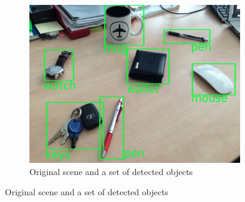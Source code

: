 \documentclass[conference]{IEEEtran}
\begin{document}
	
	\begin{figure}[th!]
		\center
		\begin{subfigure}{1.0\columnwidth}
			\center
			\includegraphics[width=0.6\columnwidth]{img/map_original.jpg}
			\caption{Original scene and a set of detected objects}
			\label{fig:object-detection}
		\end{subfigure}
		

\end{figure}
\end{document}

